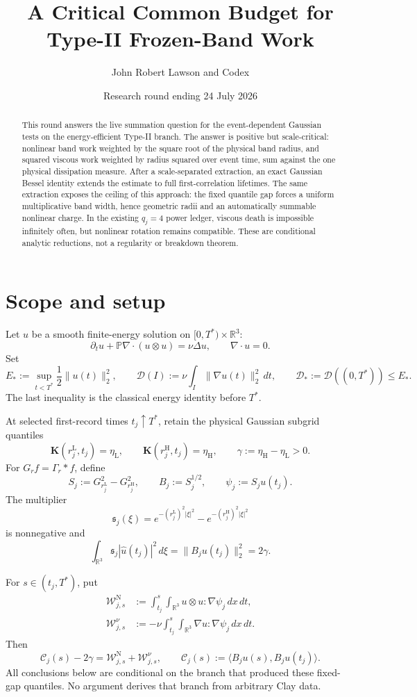 \documentclass[11pt]{article}
\title{A Critical Common Budget for Type-II Frozen-Band Work}
\author{John Robert Lawson and Codex}
\date{Research round ending 24 July 2026}
\theoremstyle{remark}
\newcommand{\R}{\mathbb R}
\newcommand{\D}{\mathcal D}
\newcommand{\WN}{\mathcal W^{\mathrm N}}
\newcommand{\WV}{\mathcal W^\nu}
\newcommand{\Cband}{\mathcal C}
\begin{document}
\maketitle

\begin{abstract}
This round answers the live summation question for the event-dependent
Gaussian tests on the energy-efficient Type-II branch.  The answer is
positive but scale-critical: nonlinear band work weighted by the square root
of the physical band radius, and squared viscous work weighted by radius
squared over event time, sum against the one physical dissipation measure.
After a scale-separated extraction, an exact Gaussian Bessel identity
extends the estimate to full first-correlation lifetimes.  The same
extraction exposes the ceiling of this approach: the fixed quantile gap
forces a uniform multiplicative band width, hence geometric radii and an
automatically summable nonlinear charge.  In the existing \(q_j=4\) power
ledger, viscous death is impossible infinitely often, but nonlinear rotation
remains compatible.  These are conditional analytic reductions, not a
regularity or breakdown theorem.
\end{abstract}

\section{Scope and setup}

Let \(u\) be a smooth finite-energy solution on
\([0,T^*)\times\R^3\):
\[
 \partial_tu+\mathbb P\nabla\!\cdot(u\otimes u)=\nu\Delta u,
 \qquad \nabla\!\cdot u=0.
\]
Set
\[
 E_*:=\sup_{t<T^*}\frac12\|u(t)\|_2^2,
 \qquad
 \D(I):=\nu\int_I\|\nabla u(t)\|_2^2\,dt,
 \qquad
 \D_*:=\D((0,T^*))\le E_*.
\]
The last inequality is the classical energy identity before \(T^*\).

At selected first-record times \(t_j\uparrow T^*\), retain the physical
Gaussian subgrid quantiles
\[
 \mathbf K(r_j^{\mathrm L},t_j)=\eta_{\mathrm L},
 \qquad
 \mathbf K(r_j^{\mathrm H},t_j)=\eta_{\mathrm H},
 \qquad
 \gamma:=\eta_{\mathrm H}-\eta_{\mathrm L}>0.
\]
For \(G_rf=\Gamma_r*f\), define
\[
 S_j:=G_{r_j^{\mathrm L}}^2-G_{r_j^{\mathrm H}}^2,
 \qquad
 B_j:=S_j^{1/2},
 \qquad
 \psi_j:=S_ju(t_j).
\]
The multiplier
\[
 \mathfrak s_j(\xi)
 =
 e^{-(r_j^{\mathrm L})^2|\xi|^2}
 -
 e^{-(r_j^{\mathrm H})^2|\xi|^2}
\]
is nonnegative and
\[
 \int_{\R^3}\mathfrak s_j|\widehat u(t_j)|^2\,d\xi
 =
 \|B_ju(t_j)\|_2^2
 =
 2\gamma.
\]

For \(s\in(t_j,T^*)\), put
\[
\begin{aligned}
 \WN_{j,s}
 &:=
 \int_{t_j}^{s}\!\!\int_{\R^3}
 u\otimes u:\nabla\psi_j\,dx\,dt,\\
 \WV_{j,s}
 &:=
 -\nu\int_{t_j}^{s}\!\!\int_{\R^3}
 \nabla u:\nabla\psi_j\,dx\,dt.
\end{aligned}
\]
Then
\[
 \Cband_j(s)-2\gamma
 =
 \WN_{j,s}+\WV_{j,s},
 \qquad
 \Cband_j(s):=
 \langle B_ju(s),B_ju(t_j)\rangle.
\]
All conclusions below are conditional on the branch that produced these
fixed-gap quantiles.  No argument derives that branch from arbitrary Clay
data.
\end{document}
